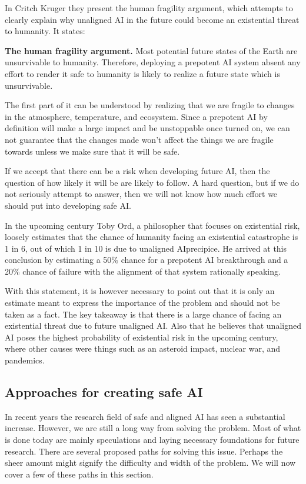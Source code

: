 \documentclass[12pt,A4]{report}
\newcommand{\autobaj}{}
\theoremstyle{definition}
\begin{document}
In \autobaj{Critch Kruger} they present the human fragility argument, which attempts to clearly explain why unaligned AI in the future could become an existential threat to humanity. It states:
\begin{displayquote}
\textbf{The human fragility argument.} 
Most potential future states of the Earth are unsurvivable to humanity. Therefore, deploying a prepotent AI system absent any effort to render it safe to humanity is likely to realize a future state which is unsurvivable. 
\end{displayquote}
The first part of it can be understood by realizing that we are fragile to changes in the atmosphere, temperature, and ecosystem. Since a prepotent AI by definition will make a large impact and be unstoppable once turned on, we can not guarantee that the changes made won't affect the things we are fragile towards unless we make sure that it will be safe. 

If we accept that there can be a risk when developing future AI, then the question of how likely it will be are likely to follow. A hard question, but if we do not seriously attempt to answer, then we will not know how much effort we should put into developing safe AI. 

In the upcoming century Toby Ord, a philosopher that focuses on existential risk, loosely estimates that the chance of humanity facing an existential catastrophe is 1 in 6, out of which 1 in 10 is due to unaligned AI\autobaj{precipice}. He arrived at this conclusion by estimating a 50\% chance for a prepotent AI breakthrough and a 20\% chance of failure with the alignment of that system \autobaj{rationally speaking}. 

With this statement, it is however necessary to point out that it is only an estimate meant to express the importance of the problem and should not be taken as a fact. The key takeaway is that there is a large chance of facing an existential threat due to future unaligned AI. Also that he believes that unaligned AI poses the highest probability of existential risk in the upcoming century, where other causes were things such as an asteroid impact, nuclear war, and pandemics. 


\subsection{Approaches for creating safe AI}
In recent years the research field of safe and aligned AI has seen a substantial increase. However, we are still a long way from solving the problem. Most of what is done today are mainly speculations and laying necessary foundations for future research. There are several proposed paths for solving this issue. Perhaps the sheer amount might signify the difficulty and width of the problem. We will now cover a few of these paths in this section.
\end{document}
